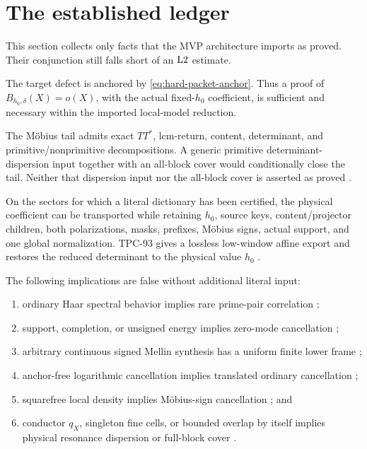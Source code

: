 \section{The established ledger}
\label{sec:established}

This section collects only facts that the MVP architecture imports as
proved.  Their conjunction still falls short of an \(\mathrm{L2}\) estimate.

\begin{proposition}
The target defect is anchored by
\eqref{eq:hard-packet-anchor}.  Thus a proof of
\(B_{h_0,\delta}(X)=o(X)\), with the actual fixed-\(h_0\)
coefficient, is sufficient and necessary within the imported
local-model reduction.
\end{proposition}

\begin{proposition}
The M\"obius tail admits exact \(TT^*\), lcm-return, content,
determinant, and primitive/nonprimitive decompositions.  A generic
primitive determinant-dispersion input together with an all-block
cover would conditionally close the tail.  Neither that dispersion
input nor the all-block cover is asserted as proved
\cite{WangTPC18,WangTPC91}.
\end{proposition}

\begin{proposition}
On the sectors for which a literal dictionary has been certified, the
physical coefficient can be transported while retaining \(h_0\),
source keys, content/projector children, both polarizations, masks,
prefixes, M\"obius signs, actual support, and one global
normalization.  TPC-93 gives a lossless low-window affine export and
restores the reduced determinant to the physical value \(h_0\)
\cite{WangTPC93}.
\end{proposition}

\begin{proposition}
The following implications are false without additional literal
input:
\begin{enumerate}[label=(\roman*),leftmargin=2em]
\item ordinary Haar spectral behavior implies rare prime-pair
  correlation \cite{WangTPC1};
\item support, completion, or unsigned energy implies zero-mode
  cancellation \cite{WangTPC81,WangTPC82};
\item arbitrary continuous signed Mellin synthesis has a uniform
  finite lower frame \cite{WangTPC51};
\item anchor-free logarithmic cancellation implies translated
  ordinary cancellation \cite{WangTPC87,WangTPC96};
\item squarefree local density implies M\"obius-sign cancellation
  \cite{WangTPC90}; and
\item conductor \(q_X\), singleton fine cells, or bounded overlap by
  itself implies physical resonance dispersion or full-block cover
  \cite{WangTPC91,WangTPC99,WangTPC100}.
\end{enumerate}
\end{proposition}


